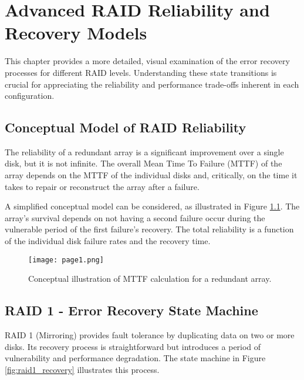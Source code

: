 \chapter{Advanced RAID Reliability and Recovery Models}

This chapter provides a more detailed, visual examination of the error recovery processes for different RAID levels. Understanding these state transitions is crucial for appreciating the reliability and performance trade-offs inherent in each configuration.

\section{Conceptual Model of RAID Reliability}

The reliability of a redundant array is a significant improvement over a single disk, but it is not infinite. The overall Mean Time To Failure (MTTF) of the array depends on the MTTF of the individual disks and, critically, on the time it takes to repair or reconstruct the array after a failure.

A simplified conceptual model can be considered, as illustrated in Figure \ref{fig:mttf_concept}. The array's survival depends on not having a second failure occur during the vulnerable period of the first failure's recovery. The total reliability is a function of the individual disk failure rates and the recovery time.

\begin{figure}[h!]
    \centering
    \texttt{[image: page1.png]} %
    \caption{Conceptual illustration of MTTF calculation for a redundant array.}
    \label{fig:mttf_concept}
\end{figure}

\section{RAID 1 - Error Recovery State Machine}

RAID 1 (Mirroring) provides fault tolerance by duplicating data on two or more disks. Its recovery process is straightforward but introduces a period of vulnerability and performance degradation. The state machine in Figure \ref{fig:raid1_recovery} illustrates this process.

